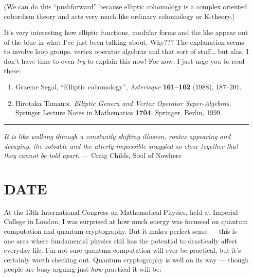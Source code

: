 \documentclass{article}
\def\tightlist{}
\renewcommand{\texttt}[1]{%
  \begingroup
  \ttfamily
  \begingroup\lccode`~=`/\lowercase{\endgroup\def~}{/\discretionary{}{}{}}%
  \begingroup\lccode`~=`[\lowercase{\endgroup\def~}{[\discretionary{}{}{}}%
  \begingroup\lccode`~=`.\lowercase{\endgroup\def~}{.\discretionary{}{}{}}%
  \catcode`/=\active\catcode`[=\active\catcode`.=\active
  \scantokens{#1\noexpand}%
  \endgroup
}
\begin{document}
(We can do this ``pushforward'' because elliptic cohomology is a complex
oriented cobordism theory and acts very much like ordinary cohomology or
K-theory.)

It's very interesting how elliptic functions, modular forms and the like
appear out of the blue in what I've just been talking about. Why??? The
explanation seems to involve loop groups, vertex operator algebras and
that sort of stuff\ldots{} but alas, I don't have time to even
\emph{try} to explain this now! For now, I just urge you to read these:

\begin{enumerate}
\def\labelenumi{\arabic{enumi})}
\setcounter{enumi}{6}
\item
  Graeme Segal, ``Elliptic cohomology'', \emph{Asterisque}
  \textbf{161--162} (1988), 187--201.
\item
  Hirotaka Tamanoi, \emph{Elliptic Genera and Vertex Operator
  Super-Algebras}, Springer Lecture Notes in Mathematics \textbf{1704},
  Springer, Berlin, 1999.
\end{enumerate}

\begin{center}\rule{0.5\linewidth}{0.5pt}\end{center}

\emph{It is like walking through a constantly shifting illusion, routes
appearing and decaying, the solvable and the utterly impossible snuggled
so close together that they cannot be told apart.} --- Craig Childs,
Soul of Nowhere
\hypertarget{week154}{%
\section{DATE}\label{week154}}

At the 13th International Congress on Mathematical Physics, held at
Imperial College in London, I was surprised at how much energy was
focussed on quantum computation and quantum cryptography. But it makes
perfect sense --- this is one area where fundamental physics still has
the potential to drastically affect everyday life. I'm not sure quantum
computation will ever be practical, but it's certainly worth checking
out. Quantum cryptography is well on its way --- though people are busy
arguing just \emph{how} practical it will be:

\end{document}
